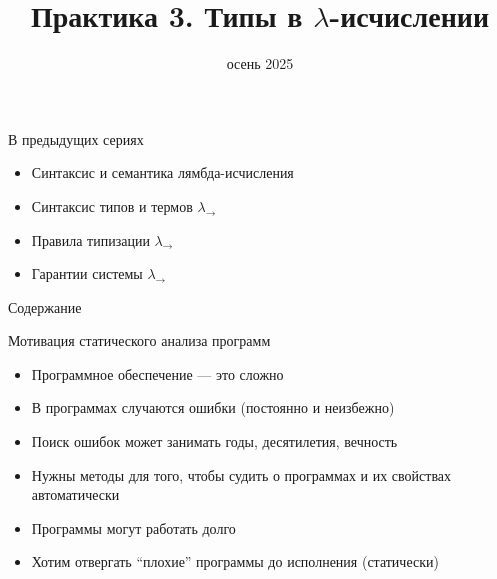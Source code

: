 
\newif\ifhandout




\title[3. Типы в $\lambda$-исчислении]{Практика 3. Типы в $\lambda$-исчислении}
\date{осень 2025}



    \setcounter{framenumber}{-1}
    \mymaketitle

    \begin{frame}{В предыдущих сериях}
        \begin{itemize}
            \item Синтаксис и семантика лямбда-исчисления
            \item[\newtopic] Синтаксис типов и термов $\lambda_\to$
            \item[\newtopic] Правила типизации $\lambda_\to$
            \item[\newtopic] Гарантии системы $\lambda_\to$
        \end{itemize}
    \end{frame}

    \begin{frame}[noframenumbering]{Содержание}
        \tableofcontents
    \end{frame}



    \begin{frame}{Мотивация статического анализа программ}
        \begin{itemize}
            \item Программное обеспечение — это сложно
            \item В программах случаются ошибки (постоянно и неизбежно)
            \item Поиск ошибок может занимать годы, десятилетия, вечность
            \item Нужны методы для того, чтобы судить о программах и их
            свойствах автоматически
            \item Программы могут работать долго
            \item Хотим отвергать ``плохие'' программы до исполнения (статически)
        \end{itemize}
    \end{frame}

